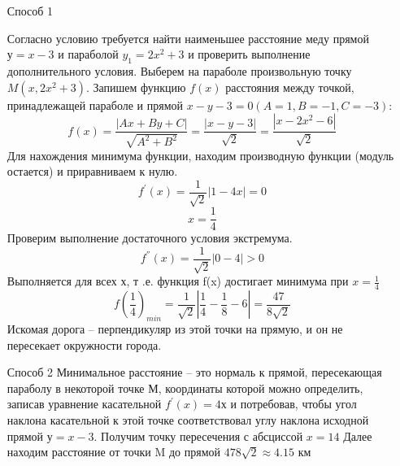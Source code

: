 \solutionSection

\begin{enumerate}
    \item [Способ 1] \;
    

    Согласно условию требуется найти наименьшее расстояние меду прямой $у=x-3$ и параболой $y_1=2x^2+3$ и проверить выполнение дополнительного условия. Выберем на параболе произвольную точку $M (x,2x^2+3)$. Запишем функцию $f(x)$ расстояния между точкой, принадлежащей параболе и прямой $x-y-3=0 (A=1, B=-1, C=-3)$:
    $$f(x)=\frac{|Ax+By+C|}{\sqrt{A^2+B^2}}=\frac{|x-y-3|}{\sqrt{2}}=\frac{|x-2x^2-6|}{\sqrt{2}}$$
    Для нахождения минимума функции, находим производную функции (модуль остается) и приравниваем к нулю. 
    $$f^{'}(x)=\frac{1}{\sqrt{2}}|1-4x|=0$$
    $$x=\frac{1}{4}$$
    Проверим выполнение достаточного условия экстремума. 
    $$f^{''}(x)=\frac{1}{\sqrt{2}}|0-4|>0$$
    Выполняется для всех х, т .е. функция f(x) достигает минимума при  $x=\frac{1}{4}$
    $$f\left(\frac{1}{4}\right)_{min} =\frac{1}{\sqrt{2}}\left|\frac{1}{4}-\frac{1}{8}-6\right|=\frac{47}{8\sqrt{2}}$$
    Искомая дорога – перпендикуляр из этой точки на прямую, и он не пересекает окружности города.\\
    \item [Способ 2]
    Минимальное расстояние – это нормаль к прямой, пересекающая параболу в некоторой точке М, координаты которой можно определить, записав уравнение касательной $f^{'}(x)=4х$ и потребовав, чтобы угол наклона касательной к этой точке соответствовал углу наклона исходной прямой $у=x-3$. Получим точку пересечения с абсциссой $x=14$ Далее находим расстояние от точки M до прямой $478\sqrt{2}\approx4.15$ км
    
    \end{enumerate}